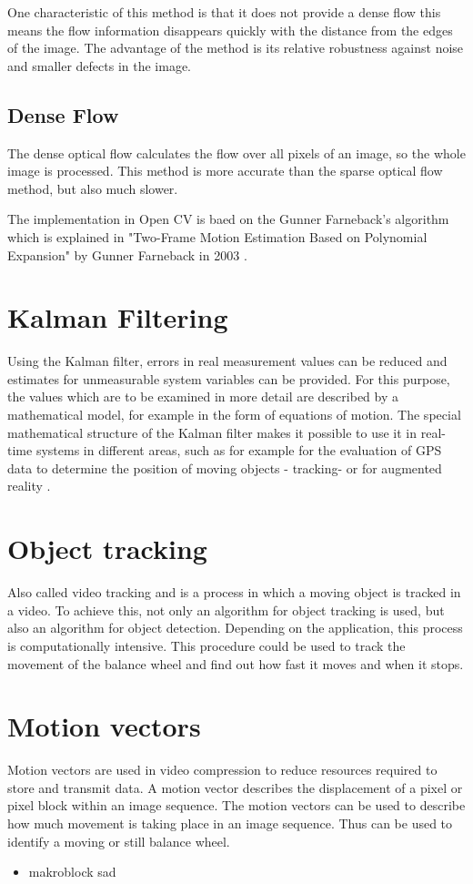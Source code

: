 \documentclass[12pt, a4paper]{report}
\begin{document}
    One characteristic of this method is that it does not provide a dense flow this means the flow information disappears quickly with the distance from the edges of the image. The advantage of the method is its relative robustness against noise and smaller defects in the image.
    
       \subsection{Dense Flow}
The dense optical flow calculates the flow over all pixels of an image, so the whole image is processed. This method is more accurate than the sparse optical flow method, but also much slower.

The implementation in Open CV is baed on the Gunner Farneback's algorithm which is explained in "Two-Frame Motion Estimation Based on Polynomial Expansion" by Gunner Farneback in 2003 \cite{Farneback2003}.
  
   \section{Kalman Filtering} 
   Using the Kalman filter, errors in real measurement values can be reduced and estimates for unmeasurable system variables can be provided. For this purpose, the values which are to be examined in more detail are described by a mathematical model, for example in the form of equations of motion. The special mathematical structure of the Kalman filter makes it possible to use it in real-time systems in different areas, such as for example for the evaluation of GPS data to determine the position of moving objects - tracking- or for augmented reality \cite{Grewal1993}.
   
   \section{Object tracking}
   Also called video tracking and is a process in which a moving object is tracked in a video. To achieve this, not only an algorithm for object tracking is used, but also an algorithm for object detection. Depending on the application, this process is computationally intensive. This procedure could be used to track the movement of the balance wheel and find out how fast it moves and when it stops. \cite{objectTracking}
    
 \section{Motion vectors}
 Motion vectors are used in video compression to reduce resources required to store and transmit data. A motion vector describes the displacement of a pixel or pixel block within an image sequence. The motion vectors can be used to describe how much movement is taking place in an image sequence. Thus can be used to identify a moving or still balance wheel.
    \begin{itemize}
        \item makroblock sad
        \end{itemize}
    
\end{document}
